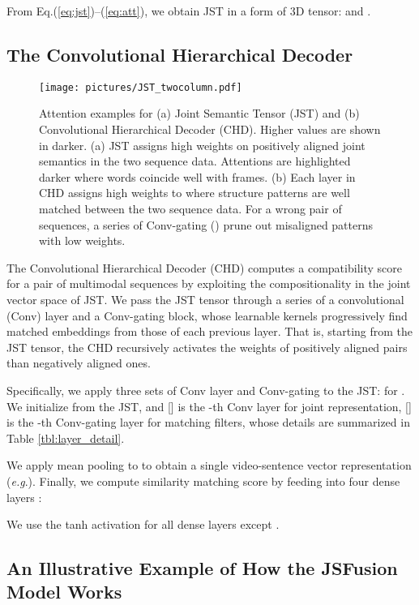 \documentclass[runningheads]{llncs}
\makeatletter
\DeclareRobustCommand\onedot{\futurelet\@let@token\@onedot}
\def\onedot{.\@\xspace}
\def\eg{\textit{e.g}\onedot} \def\Eg{\textit{E.g}\onedot}
\makeatother
\begin{document}
From Eq.(\ref{eq:jst})--(\ref{eq:att}), we obtain JST in a form of 3D tensor:  and  . 




\subsection{The Convolutional Hierarchical Decoder}
\label{subsec:hierarchical_decoder}
\begin{figure*}[t]
\centering
\texttt{[image: pictures/JST\_twocolumn.pdf]}
\caption{Attention examples for (a) Joint Semantic Tensor (JST) and (b) Convolutional Hierarchical Decoder (CHD). Higher values are shown in darker.
(a) JST assigns high weights on positively aligned joint semantics in the two sequence data. Attentions are highlighted darker where words coincide well with frames. (b) Each layer in CHD assigns high weights to where structure patterns are well matched between the two sequence data. 
For a wrong pair of sequences, a series of Conv-gating () prune out misaligned patterns with low weights. 
}


\label{fig:chd_att}
\end{figure*}
The Convolutional Hierarchical Decoder (CHD) computes a compatibility score for a pair of multimodal sequences by exploiting the compositionality in the joint vector space of JST.
We pass the JST tensor through a series of a convolutional (Conv) layer and a Conv-gating block, whose learnable kernels progressively find matched embeddings from those of each previous layer.
That is, starting from the JST tensor, the CHD recursively activates the weights of positively aligned pairs than negatively aligned ones. 

Specifically, we apply three sets of Conv layer and Conv-gating to the JST: 
for . We initialize  from the JST, and  [] is the -th Conv layer for joint representation, [] is the -th Conv-gating layer for matching filters, 
whose details are summarized in Table \ref{tbl:layer_detail}.

We apply mean pooling to  to obtain a single  video-sentence vector representation  (\eg ). 
Finally, we compute similarity matching score by feeding  into four dense layers :

We use the tanh activation for all dense layers except . 


\subsection{An Illustrative Example of How the JSFusion Model Works}
\label{subsec:illustrative_example}
\end{document}
